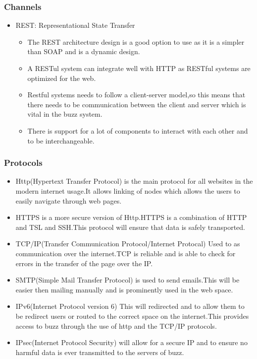 
%
\subsubsection{Channels}
\begin{itemize}
\item REST: Representational State Transfer
\begin{itemize}
\item The REST architecture design is a good option to use as it is a simpler than SOAP and is a dynamic design.
\item A RESTul system can integrate well with HTTP as RESTful systems are optimized for the web.
\item Restful systems needs to follow a client-server model,so this means that there needs to be communication between the client and server which is vital in the buzz system.
\item There is support for a lot of components to interact with each other and to be interchangeable.
\end{itemize}
\end{itemize}
\subsubsection{Protocols}
\begin{itemize}
\item Http(Hypertext Transfer Protocol) is the main protocol for all websites in the modern internet usage.It allows linking of nodes which allows the users to easily navigate through web pages.
\item HTTPS is a more secure version of Http.HTTPS is a combination of HTTP and TSL and SSH.This protocol will ensure that data is safely transported.
\item TCP/IP(Transfer Communication Protocol/Internet Protocal) Used to as communication over the internet.TCP is reliable and is able to check for errors in the transfer of the page over the IP.
\item SMTP(Simple Mail Transfer Protocol) is used to send emails.This will be easier then mailing manually and is prominently used in the web space.
\item IPv6(Internet Protocol version 6) This will  redirected and to allow them to be redirect users or routed to the correct space on the internet.This provides access to buzz through the use of http and the TCP/IP protocols.
\item IPsec(Internet Protocol Security) will allow for a secure IP and to ensure no harmful data is ever transmitted to the servers of buzz.
\end{itemize}

